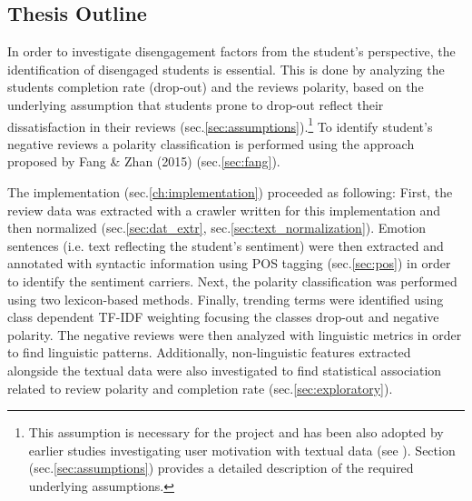 \documentclass[
	a4paper,
	pdftex,
	12pt,	
	footinclude=true,
	fleqn,
	final,
	]{report}%
\begin{document}
\vspace{-0.45cm}
\subsection{Thesis Outline} %
\label{sec:outline}
\vspace{-0.3cm}

In order to investigate disengagement factors from the student's 
perspective, the identification of disengaged students is essential. 
This is done by analyzing the students completion rate (drop-out) and %
the reviews polarity, based on the underlying assumption that students
prone to drop-out reflect their dissatisfaction 
in their reviews \cite{Adamopoulos2013} (sec.\ref{sec:assumptions}).\footnote{ 
This assumption is necessary for the project and has been also adopted by earlier studies 
investigating user motivation with textual data (see \cite{Strapparava2015,Fang2015,Pennebaker2010,Adamopoulos2013}).
Section (sec.\ref{sec:assumptions}) provides a detailed description of the 
required underlying assumptions.} To identify student's negative reviews 
a polarity classification is performed using 
the approach proposed by Fang \& Zhan (2015) (sec.\ref{sec:fang}). 

The implementation (sec.\ref{ch:implementation}) 
proceeded as following: First, the review data was extracted 
with a crawler written for this implementation and 
then normalized (sec.\ref{sec:dat_extr}, sec.\ref{sec:text_normalization}).
Emotion sentences \cite{Liu2012} (i.e. text reflecting the student's sentiment)
were then extracted and annotated with syntactic information 
using POS tagging (sec.\ref{sec:pos}) in order to identify the 
sentiment carriers. Next, the polarity classification 
was performed using two lexicon-based methods. 
Finally, trending terms were identified using
class dependent TF-IDF weighting focusing the classes
drop-out and negative polarity. The
negative reviews were then analyzed 
with linguistic metrics in order to 
find linguistic patterns.
Additionally, non-linguistic 
features extracted alongside the textual data were 
also investigated to find 
statistical association related 
to review polarity and completion rate
(sec.\ref{sec:exploratory}). 

\vspace{-0.5cm}
\end{document}
